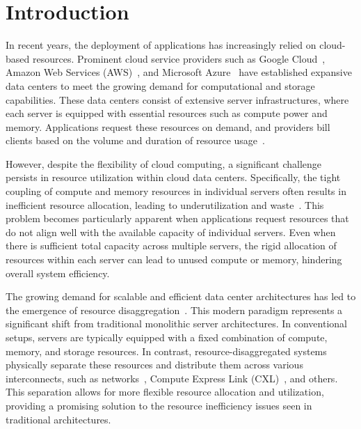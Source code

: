 \chapter{Introduction}
\label{chap:introduction}

In recent years, the deployment of applications has increasingly relied on cloud-based resources. Prominent cloud service providers such as Google Cloud~\cite{googlecloud}, Amazon Web Services (AWS)~\cite{aws}, and Microsoft Azure~\cite{azure} have established expansive data centers to meet the growing demand for computational and storage capabilities. These data centers consist of extensive server infrastructures, where each server is equipped with essential resources such as compute power and memory. Applications request these resources on demand, and providers bill clients based on the volume and duration of resource usage~\cite{cloud1, cloud2, cloud3}.

However, despite the flexibility of cloud computing, a significant challenge persists in resource utilization within cloud data centers. Specifically, the tight coupling of compute and memory resources in individual servers often results in inefficient resource allocation, leading to underutilization and waste~\cite{cxl_azure, tpp, pond,legoos}. This problem becomes particularly apparent when applications request resources that do not align well with the available capacity of individual servers. Even when there is sufficient total capacity across multiple servers, the rigid allocation of resources within each server can lead to unused compute or memory, hindering overall system efficiency.

The growing demand for scalable and efficient data center architectures has led to the emergence of resource disaggregation~\cite{mind, legoos, disagg, memdisagg1, memdisagg2, memdisagg3, memdisagg4, memdisagg5, memdisagg6}. This modern paradigm represents a significant shift from traditional monolithic server architectures. In conventional setups, servers are typically equipped with a fixed combination of compute, memory, and storage resources. In contrast, resource-disaggregated systems physically separate these resources and distribute them across various interconnects, such as networks~\cite{disagg, legoos, mind}, Compute Express Link (CXL)~\cite{cxl, cxlasic}, and others. This separation allows for more flexible resource allocation and utilization, providing a promising solution to the resource inefficiency issues seen in traditional architectures.




